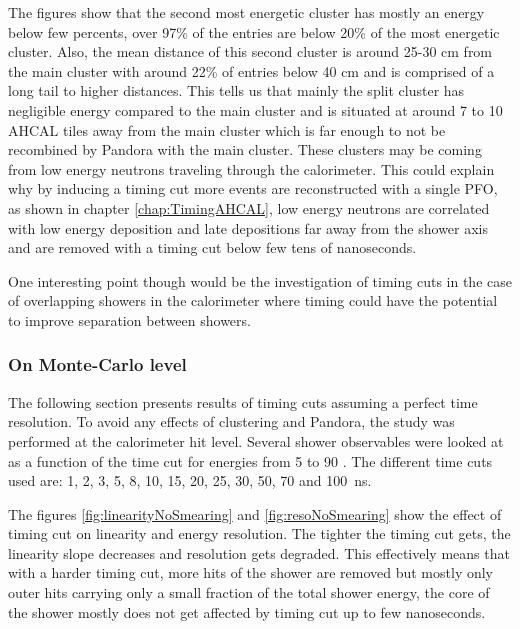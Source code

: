 The figures show that the second most energetic cluster has mostly an energy below few percents, over 97\% of the entries are below 20\% of the most energetic cluster. Also, the mean distance of this second cluster is around 25-30 cm from the main cluster with around 22\% of entries below 40 cm and is comprised of a long tail to higher distances. This tells us that mainly the split cluster has negligible energy compared to the main cluster and is situated at around 7 to 10 AHCAL tiles away from the main cluster which is far enough to not be recombined by Pandora with the main cluster. These clusters may be coming from low energy neutrons traveling through the calorimeter. This could explain why by inducing a timing cut more events are reconstructed with a single PFO, as shown in chapter \ref{chap:TimingAHCAL}, low energy neutrons are correlated with low energy deposition and late depositions far away from the shower axis and are removed with a timing cut below few tens of nanoseconds.

One interesting point though would be the investigation of timing cuts in the case of overlapping showers in the calorimeter where timing could have the potential to improve separation between showers.

\subsubsection{On Monte-Carlo level}
\label{sec:MCLevelILDTiming}

The following section presents results of timing cuts assuming a perfect time resolution. To avoid any effects of clustering and Pandora, the study was performed at the calorimeter hit level. Several shower observables were looked at as a function of the time cut for energies from 5 \GeV to 90 \GeV \kzeroL. The different time cuts used are: 1, 2, 3, 5, 8, 10, 15, 20, 25, 30, 50, 70 and \SI{100}{\nano\second}.

The figures \ref{fig:linearityNoSmearing} and \ref{fig:resoNoSmearing} show the effect of timing cut on linearity and energy resolution. The tighter the timing cut gets, the linearity slope decreases and resolution gets degraded. This effectively means that with a harder timing cut, more hits of the shower are removed but mostly only outer hits carrying only a small fraction of the total shower energy, the core of the shower mostly does not get affected by timing cut up to few nanoseconds.

